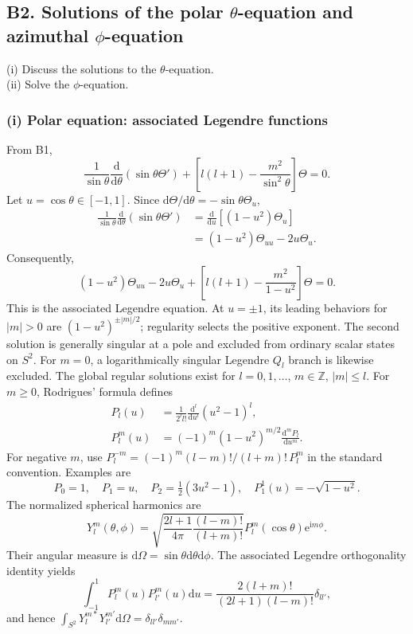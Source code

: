 \documentclass[11pt,a4paper]{article}
\newcommand{\dd}{\mathrm{d}}
\newcommand{\iu}{\mathrm{i}}
\newcommand{\ee}{\mathrm{e}}
\begin{document}
\subsection{B2. Solutions of the polar \texorpdfstring{$\theta$}{theta}-equation and azimuthal \texorpdfstring{$\phi$}{phi}-equation}
\begin{questionbox}(i) Discuss the solutions to the \(\theta\)-equation.\\ (ii) Solve the \(\phi\)-equation.\end{questionbox}
\subsubsection*{(i) Polar equation: associated Legendre functions}
From B1,
\begin{equation}\frac1{\sin\theta}\frac{\dd}{\dd\theta}(\sin\theta\Theta')+\left[l(l+1)-\frac{m^2}{\sin^2\theta}\right]\Theta=0.\end{equation}
Let \(u=\cos\theta\in[-1,1]\). Since \(\dd\Theta/\dd\theta=-\sin\theta\Theta_u\),
\begin{align}
\frac1{\sin\theta}\frac{\dd}{\dd\theta}(\sin\theta\Theta')&=\frac{\dd}{\dd u}\left[(1-u^2)\Theta_u\right]\\
&=(1-u^2)\Theta_{uu}-2u\Theta_u.
\end{align}
Consequently,
\begin{equation}\boxed{(1-u^2)\Theta_{uu}-2u\Theta_u+\left[l(l+1)-\frac{m^2}{1-u^2}\right]\Theta=0.}\end{equation}
This is the associated Legendre equation. At \(u=\pm1\), its leading behaviors for \(|m|>0\) are \((1-u^2)^{\pm|m|/2}\); regularity selects the positive exponent. The second solution is generally singular at a pole and excluded from ordinary scalar states on \(S^2\). For \(m=0\), a logarithmically singular Legendre \(Q_l\) branch is likewise excluded. The global regular solutions exist for \(l=0,1,\ldots\), \(m\in\mathbb Z\), \(|m|\le l\). For \(m\ge0\), Rodrigues' formula defines
\begin{align}
P_l(u)&=\frac1{2^ll!}\frac{\dd^l}{\dd u^l}(u^2-1)^l,\\
P_l^m(u)&=(-1)^m(1-u^2)^{m/2}\frac{\dd^mP_l}{\dd u^m}.
\end{align}
For negative \(m\), use \(P_l^{-m}=(-1)^m(l-m)!/(l+m)!\,P_l^m\) in the standard convention. Examples are
\begin{equation}P_0=1,\quad P_1=u,\quad P_2=\tfrac12(3u^2-1),\quad P_1^1(u)=-\sqrt{1-u^2}.\end{equation}
The normalized spherical harmonics are
\begin{equation}\boxed{Y_l^m(\theta,\phi)=\sqrt{\frac{2l+1}{4\pi}\frac{(l-m)!}{(l+m)!}}P_l^m(\cos\theta)\ee^{\iu m\phi}.}\end{equation}
Their angular measure is \(\dd\Omega=\sin\theta\dd\theta\dd\phi\). The associated Legendre orthogonality identity yields
\begin{equation}\int_{-1}^1P_l^m(u)P_{l'}^m(u)\dd u=\frac{2(l+m)!}{(2l+1)(l-m)!}\delta_{ll'},\end{equation}
and hence \(\int_{S^2}Y_l^{m*}Y_{l'}^{m'}\dd\Omega=\delta_{ll'}\delta_{mm'}\).
\end{document}
